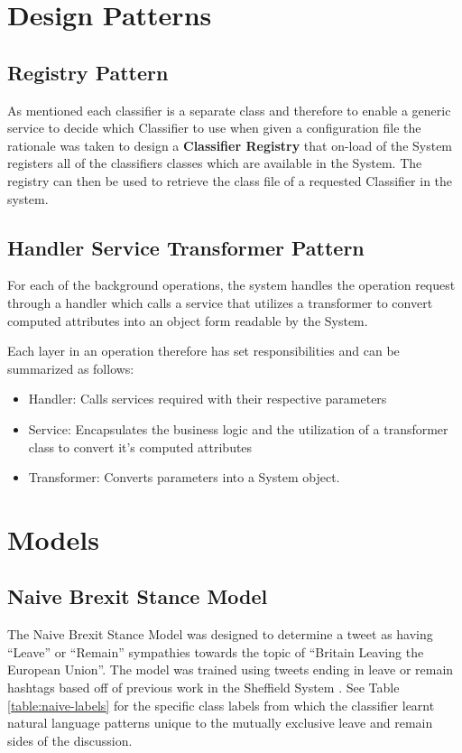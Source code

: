 \documentclass[11pt]{report}
\begin{document}
\clearpage

\section{Design Patterns}

\subsection*{Registry Pattern}
As mentioned each classifier is a separate class and therefore to enable a generic service to decide which Classifier to use when given a configuration file the rationale was taken to design a  \textbf{Classifier Registry} that on-load of the System registers all of the classifiers classes which are available in the System. The registry can then be used to retrieve the class file of a requested Classifier in the system.

\subsection*{Handler Service Transformer Pattern}
For each of the background operations, the system handles the operation request through a handler which calls a service that utilizes a transformer to convert computed attributes into an object form readable by the System.

Each layer in an operation therefore has set responsibilities and can be summarized as follows:

\begin{itemize}
\item Handler: Calls services required with their respective parameters
\item Service:  Encapsulates the business logic and the utilization of a transformer class to convert it's computed attributes
\item Transformer: Converts parameters into a System object.
\end{itemize}

\section{Models}
\subsection{Naive Brexit Stance Model}
The Naive Brexit Stance Model was designed to determine a tweet as having ``Leave'' or ``Remain'' sympathies towards the topic of ``Britain Leaving the European Union''. The model was trained using tweets ending in leave or remain hashtags based off of previous work in the Sheffield System  \citep{maynard_framework_2017}. See Table \ref{table:naive-labels} for the specific class labels from which the classifier learnt natural language patterns unique to the mutually exclusive leave and remain sides of the discussion.
\\
\end{document}
